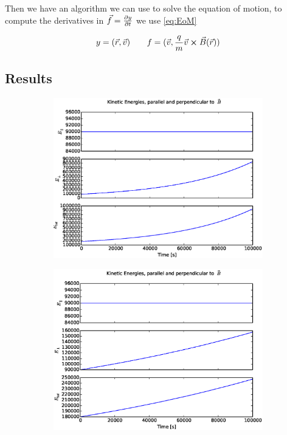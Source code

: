 \documentclass[x11names]{article}
\renewcommand{\va}{\vec}
\begin{document}
    Then we have an algorithm we can use to solve the equation of motion, to compute the derivatives in \(\va{f} = \pdv{y}{t}\) we use \cref{eq:EoM} 

    \begin{align}
      y = ( \va{r}, \va{v} )
      \qquad
      f = ( \va{v}, \frac{q}{m} \va{ v }\cross \va{B}(\va{r})  )
    \end{align}


\subsection{Results}
    
    \begin{figure} 
      \begin{subfigure}{0.45\textwidth}
        \includegraphics[width = \textwidth]{../source/figures/energyEuler_simple8-3}
      \end{subfigure}
      \begin{subfigure}{0.45\textwidth}
        \includegraphics[width = \textwidth]{../source/figures/energyVerlet_simple8-3}

\end{subfigure}
\end{figure}
\end{document}
